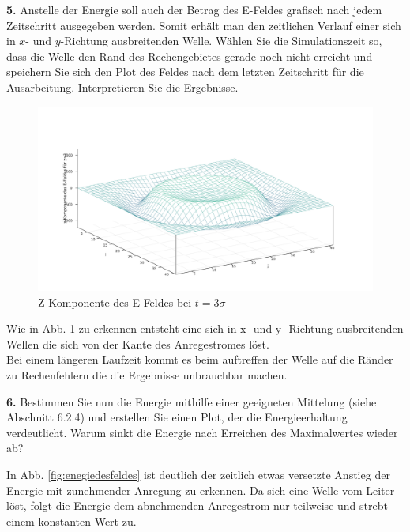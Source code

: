 \documentclass[Protokollheft.tex]{subfiles}
\begin{document}
\begin{framed}
	\noindent \textbf{5.} Anstelle der Energie soll auch der Betrag des E-Feldes grafisch nach jedem Zeitschritt ausgegeben werden.
Somit erhält man den zeitlichen Verlauf einer sich in $x$- und $y$-Richtung
ausbreitenden Welle. Wählen Sie die Simulationszeit so, dass die Welle den Rand des Rechengebietes gerade noch nicht erreicht und speichern Sie sich den Plot des Feldes nach dem letzten Zeitschritt für die Ausarbeitung. Interpretieren Sie die Ergebnisse.\label{exer:visualizeWave}
\end{framed}

\begin{figure}
	\centering
	\includegraphics[width=0.7\linewidth]{Welle}
	\caption{Z-Komponente des E-Feldes bei $t= 3\sigma$}
	\label{fig:welle}
\end{figure}


Wie in Abb. \ref{fig:welle} zu erkennen entsteht eine sich in x- und y- Richtung ausbreitenden Wellen die sich von der Kante des Anregestromes löst.\\
 Bei einem längeren Laufzeit kommt es beim auftreffen der Welle auf die Ränder zu Rechenfehlern die die Ergebnisse unbrauchbar machen. 

\begin{framed}
	\noindent \textbf{6.} Bestimmen Sie nun die Energie mithilfe einer geeigneten Mittelung (siehe Abschnitt 6.2.4) und erstellen Sie einen Plot, der die Energieerhaltung verdeutlicht. Warum sinkt die Energie nach Erreichen des Maximalwertes wieder ab?\label{exer:energyConservation}
\end{framed}

In Abb. \ref{fig:enegiedesfeldes} ist deutlich der zeitlich etwas versetzte Anstieg der Energie mit zunehmender Anregung zu erkennen. Da sich eine Welle vom Leiter löst, folgt die Energie dem abnehmenden Anregestrom nur teilweise und strebt einem konstanten Wert zu. 
\end{document}
